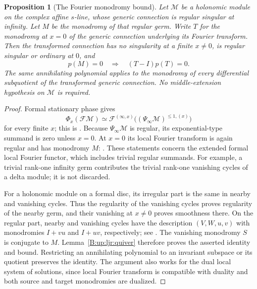 \documentclass[11pt,a4paper]{article}
\newtheorem{proposition}[theorem]{Proposition}
\theoremstyle{definition}
\theoremstyle{remark}
\numberwithin{equation}{section}
\begin{document}
\begin{proposition}[The Fourier monodromy bound]\label{B:up:ljr:fourier}
Let $\mathcal M$ be a holonomic module on the complex affine $s$-line,
whose generic connection is regular singular at infinity. Let $M$ be
the monodromy of that regular germ. Write $T$ for the monodromy at
$x=0$ of the generic connection underlying its Fourier transform.
Then the transformed connection has no singularity at a finite
$x\ne0$, is regular singular or ordinary at $0$, and
\[
                 p(M)=0\quad\Longrightarrow\quad(T-I)p(T)=0.
\]
The same annihilating polynomial applies to the monodromy of every
differential subquotient of the transformed generic connection.
No middle-extension hypothesis on $\mathcal M$ is required.
\end{proposition}
\begin{proof}
Formal stationary phase gives
\[
 \Phi_x(\mathcal F\mathcal M)
  \simeq\mathcal F^{(\infty,x)}
       \bigl((\Psi_\infty\mathcal M)^{\le1,(x)}\bigr)
\]
for every finite $x$; this is \cite[Corollary~2.3(1)]{LJR_Arinkin}.
Because $\Psi_\infty\mathcal M$ is regular, its exponential-type
summand is zero unless $x=0$.  At $x=0$ its local Fourier transform
is again regular and has monodromy $M$:
\cite[Remark~5.2 and Remark~5.3(4)]{LJR_Sabbah}.
These statements concern the extended formal local Fourier functor,
which includes trivial regular summands. For example, a trivial
rank-one infinity germ contributes the trivial rank-one vanishing
cycles of a delta module; it is not discarded.

For a holonomic module on a formal disc, its irregular part is the
same in nearby and vanishing cycles. Thus the regularity of the
vanishing cycles proves regularity of the nearby germ, and their
vanishing at $x\ne0$ proves smoothness there.  On the regular part,
nearby and vanishing cycles have the description
$(V,W,u,v)$ with monodromies $I+vu$ and $I+uv$, respectively;
see \cite[\S3.3, formula~(3.3)]{LJR_Arinkin}.  The vanishing
monodromy $S$ is conjugate to $M$. Lemma~\ref{B:up:ljr:quiver}
therefore proves the asserted identity and bound. Restricting an
annihilating polynomial to an invariant subspace or its quotient
preserves the identity. The argument also works for the dual local
system of solutions, since local Fourier transform is compatible
with duality and both source and target monodromies are dualized.
\end{proof}
\end{document}
